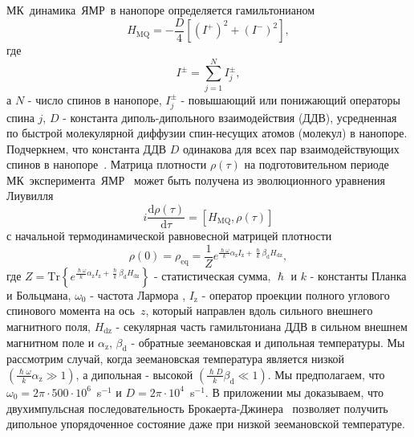 \documentclass[utf8]{jetp}
\begin{document}
МК~динамика~ЯМР~в нанопоре определяется гамильтонианом~\cite{Doronin_2019,Doronin_2009}
%
\begin{equation}
  \label{eq:1}
  H_{\mathrm{MQ}} = - \dfrac{D}{4} \left[
    \left(I^{+}\right)^{2}
    + \left(I^{-}\right)^{2}
  \right] ,
\end{equation}
%
где
%
\begin{equation}
  \label{eq:2}
  I^{\pm} = \sum\limits_{j=1}^{N} I_{j}^{\pm},
\end{equation}
%
а $N$ - число спинов в нанопоре, $I^{\pm}_{j}$ - повышающий или понижающий операторы спина $j$, $D$ - константа диполь-дипольного взаимодействия (ДДВ),
усредненная по быстрой молекулярной диффузии спин-несущих атомов (молекул) в нанопоре.
Подчеркнем, что константа ДДВ $D$ одинакова для всех пар взаимодействующих спинов в нанопоре~\cite{Doronin_2019,Doronin_2009}.
Матрица плотности $\rho(\tau)$ на подготовительном периоде МК~эксперимента~ЯМР~\cite{Baum_1985} может быть получена из эволюционного уравнения Лиувилля~\cite{Goldman_1970,Abragam_1982}
%
\begin{equation}
  \label{eq:3}
  i\dfrac{\mathrm{d}\rho(\tau)}{\mathrm{d}\tau} = \left[
  H_\mathrm{MQ},\rho(\tau)
  \right]
\end{equation}
%
с начальной термодинамической равновесной матрицей плотности
%
\begin{equation}
  \label{eq:4}
    \rho(0) = \rho_\mathrm{eq} = \dfrac{1}{Z}
    e^{
      \frac{\hslash \omega}{k} \alpha_\mathrm{z} I_\mathrm{z}
      + \frac{\hslash }{k} \beta_\mathrm{d} H_\mathrm{dz}
    },
\end{equation}
%
где
$Z = \mathrm{Tr} \left\{ e^{\frac{\hslash \omega}{k} \alpha_\mathrm{z} I_\mathrm{z} + \frac{\hslash }{k} \beta_\mathrm{d} H_\mathrm{dz}} \right\}$ - статистическая сумма,
$\hslash$ и $k$ - константы Планка и Больцмана,
$\omega_{0}$ - частота Лармора ,
$I_\mathrm{z}$ -  оператор проекции полного углового спинового момента  на ось~$z$,
который направлен вдоль сильного внешнего магнитного поля,
$H_\mathrm{dz}$ - секулярная часть гамильтониана ДДВ в сильном внешнем магнитном поле
и $\alpha_\mathrm{z}$, $\beta_\mathrm{d}$ - обратные зеемановская и дипольная температуры.
Мы рассмотрим случай, когда зеемановская температура  является низкой $({\frac{\hslash \omega}{k} \alpha_\mathrm{z}}\gg 1)$,
а дипольная - высокой $\left( \frac{\hslash{D}}{k}\beta_\mathrm{d} \ll 1\right)$.
Мы предполагаем, что $\omega_{0} = 2\pi \cdot 500 \cdot 10^{6}$~s$^{-1}$ и $D = 2\pi \cdot 10^{4}$~s$^{-1}$.
В приложении мы доказываем, что двухимпульсная последовательность Брокаерта-Джинера~\cite{Goldman_1970,Jeener_1967} позволяет получить дипольное упорядоченное состояние даже при низкой зеемановской температуре.
\end{document}
